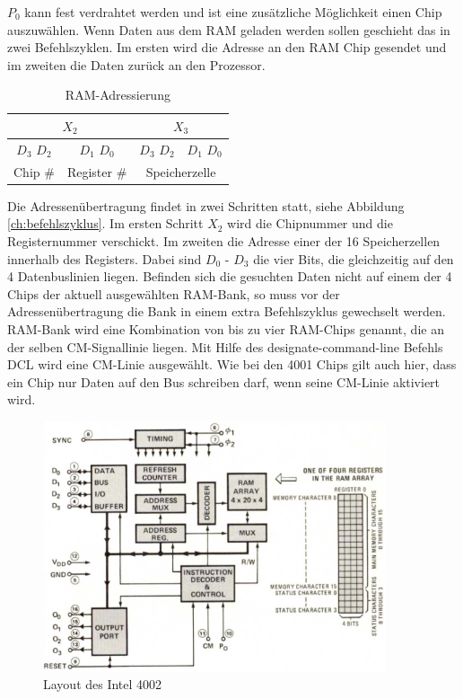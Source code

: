 $P_0$ kann fest verdrahtet werden und ist eine zusätzliche Möglichkeit einen Chip auszuwählen. Wenn Daten aus dem RAM geladen werden sollen geschieht das in zwei Befehlszyklen. Im ersten wird die Adresse an den RAM Chip gesendet und im zweiten die Daten zurück an den Prozessor.
\begin{table}[H]
	\centering
	\begin{tabular}{c | c | c | c}
		\multicolumn{2}{c|}{$X_2$} & \multicolumn{2}{c}{$X_3$} \\
		\hline
		$D_3$ \space\space\space $D_2$ & $D_1$ \space\space\space $D_0$ & $D_3$ \space\space\space $D_2$ & $D_1$ \space\space\space $D_0$ \\
		Chip {\#} & Register {\#} & \multicolumn{2}{c}{Speicherzelle}
	\end{tabular}
	\caption{RAM-Adressierung}
	\label{ramadresse}
\end{table}
Die Adressenübertragung findet in zwei Schritten statt, siehe Abbildung \ref{ch:befehlszyklus}.
Im ersten Schritt $X_2$ wird die Chipnummer und die Registernummer verschickt. 
Im zweiten die Adresse einer der 16 Speicherzellen innerhalb des Registers.
Dabei sind $D_0$ - $D_3$ die vier Bits, die gleichzeitig auf den 4 Datenbuslinien liegen. Befinden sich die gesuchten Daten nicht auf einem der 4 Chips der aktuell ausgewählten RAM-Bank, so muss vor der Adressenübertragung die Bank in einem extra Befehlszyklus gewechselt werden. RAM-Bank wird eine Kombination von bis zu vier RAM-Chips genannt, die an der selben CM-Signallinie liegen. Mit Hilfe des designate-command-line Befehls DCL wird eine CM-Linie ausgewählt. Wie bei den 4001 Chips gilt auch hier, dass ein Chip nur Daten auf den Bus schreiben darf, wenn seine CM-Linie aktiviert wird.
 \begin{figure}[h]
 	\centering
 	\includegraphics[width=0.9\textwidth]{figures/layout_4002.png}
 	\caption{Layout des Intel 4002}
 	\label{fig:layout_4002}
 \end{figure}
 
